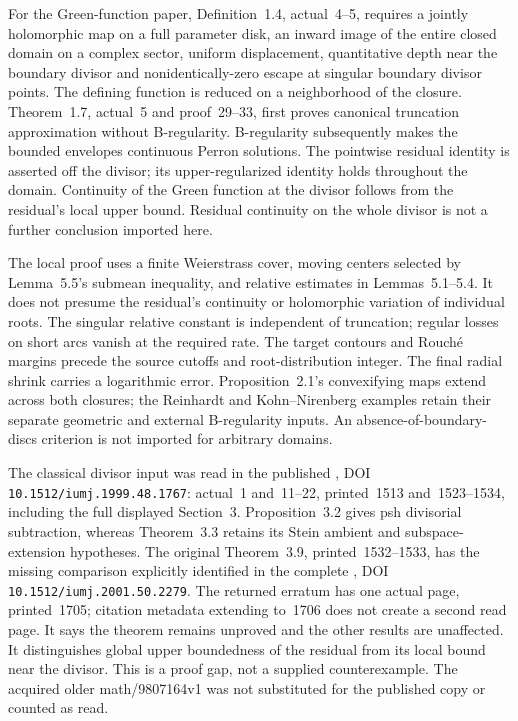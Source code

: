 For the Green-function paper, Definition~1.4, actual~4--5,
requires a jointly holomorphic map on a full parameter disk,
an inward image of the entire closed domain on a complex sector,
uniform displacement, quantitative depth near the boundary divisor
and nonidentically-zero escape at singular boundary divisor points.
The defining function is reduced on a neighborhood of the closure.
Theorem~1.7, actual~5 and proof~29--33, first proves canonical
truncation approximation without B-regularity. B-regularity
subsequently makes the bounded envelopes continuous Perron
solutions. The pointwise residual identity is asserted off the
divisor; its upper-regularized identity holds throughout the
domain. Continuity of the Green function at the divisor follows
from the residual's local upper bound. Residual continuity on
the whole divisor is not a further conclusion imported here.

The local proof uses a finite Weierstrass cover, moving centers
selected by Lemma~5.5's submean inequality, and relative estimates
in Lemmas~5.1--5.4. It does not presume the residual's continuity
or holomorphic variation of individual roots. The singular relative
constant is independent of truncation; regular losses on short
arcs vanish at the required rate. The target contours and Rouch\'e
margins precede the source cutoffs and root-distribution integer.
The final radial shrink carries a logarithmic error. Proposition~2.1's
convexifying maps extend across both closures; the Reinhardt and
Kohn--Nirenberg examples retain their separate geometric and
external B-regularity inputs. An absence-of-boundary-discs criterion
is not imported for arbitrary domains.

The classical divisor input was read in the published
\cite{LarussonSigurdsson99GreenPublished}, DOI
\nolinkurl{10.1512/iumj.1999.48.1767}: actual~1 and~11--22, printed~1513
and~1523--1534, including the full displayed Section~3.
Proposition~3.2 gives psh divisorial subtraction, whereas
Theorem~3.3 retains its Stein ambient and subspace-extension
hypotheses. The original Theorem~3.9, printed~1532--1533,
has the missing comparison explicitly identified in the complete
\cite{LarussonSigurdsson01GreenErratum}, DOI
\nolinkurl{10.1512/iumj.2001.50.2279}. The returned erratum has one
actual page, printed~1705; citation metadata extending to~1706
does not create a second read page. It says the theorem remains
unproved and the other results are unaffected. It distinguishes
global upper boundedness of the residual from its local bound
near the divisor. This is a proof gap, not a supplied counterexample.
The acquired older math/9807164v1 was not substituted for the
published copy or counted as read.

